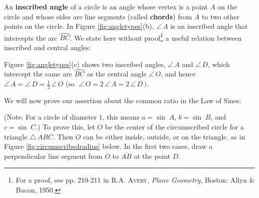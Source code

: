 An \textbf{inscribed angle} of a circle is an angle
whose vertex is a point $A$ on the circle and whose sides are line segments (called \textbf{chords})
from $A$ to two other points on the circle. In Figure \ref{fig:angletypes}(b),
$\angle\,A$ is an inscribed angle that intercepts the arc $\wideparen{BC}$. We state here without
proof\footnote{For a proof, see pp. 210-211 in \textsc{R.A. Avery}, \emph{Plane Geometry}, Boston:
Allyn \& Bacon, 1950.} a useful relation between inscribed and central angles:


Figure \ref{fig:angletypes}(c) shows two inscribed angles, $\angle\,A$ and $\angle\,D$, which
intercept the same arc $\wideparen{BC}$ as the central angle $\angle\,O$, and hence
$\angle\,A = \angle\,D = \frac{1}{2}\,\angle\,O$ (so $\;\angle\,O = 2\,\angle\,A =
2\,\angle\,D\,)$.

We will now prove our assertion about the common ratio in the Law of Sines:


\noindent (Note: For a circle of diameter $1$, this means $a=\sin\;A$, $b=\sin\;B$, and
$c=\sin\;C$.)
\newpage
To prove this, let $O$ be the center of the circumscribed circle for a triangle $\triangle\,ABC$.
Then $O$ can be either inside, outside, or on the triangle, as in Figure
\ref{fig:circumscribedradius} below. In the first two cases, draw a perpendicular line segment
from $O$ to $\overline{AB}$ at the point $D$.

